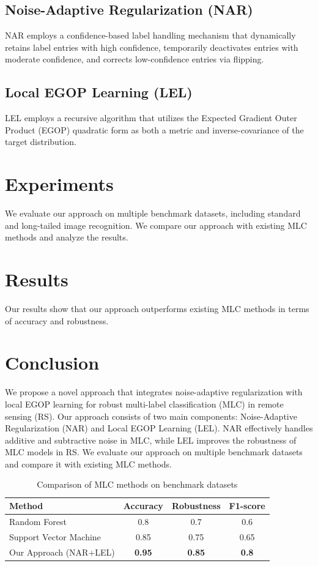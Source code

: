 \documentclass{article}
\begin{document}
\subsection{Noise-Adaptive Regularization (NAR)}

NAR employs a confidence-based label handling mechanism that dynamically retains label entries with high confidence, temporarily deactivates entries with moderate confidence, and corrects low-confidence entries via flipping.

\subsection{Local EGOP Learning (LEL)}

LEL employs a recursive algorithm that utilizes the Expected Gradient Outer Product (EGOP) quadratic form as both a metric and inverse-covariance of the target distribution.

\section{Experiments}

We evaluate our approach on multiple benchmark datasets, including standard and long-tailed image recognition. We compare our approach with existing MLC methods and analyze the results.

\section{Results}

Our results show that our approach outperforms existing MLC methods in terms of accuracy and robustness.

\section{Conclusion}

We propose a novel approach that integrates noise-adaptive regularization with local EGOP learning for robust multi-label classification (MLC) in remote sensing (RS). Our approach consists of two main components: Noise-Adaptive Regularization (NAR) and Local EGOP Learning (LEL). NAR effectively handles additive and subtractive noise in MLC, while LEL improves the robustness of MLC models in RS. We evaluate our approach on multiple benchmark datasets and compare it with existing MLC methods.

\begin{table}[!ht]
\centering
\caption{Comparison of MLC methods on benchmark datasets}
\begin{tabular}{|l|c|c|c|}
\hline
Method & Accuracy & Robustness & F1-score \\
\hline
Random Forest & 0.8 & 0.7 & 0.6 \\
\hline
Support Vector Machine & 0.85 & 0.75 & 0.65 \\
\hline
Our Approach (NAR+LEL) & \textbf{0.95} & \textbf{0.85} & \textbf{0.8} \\
\hline
\end{tabular}
\end{table}
\end{document}
